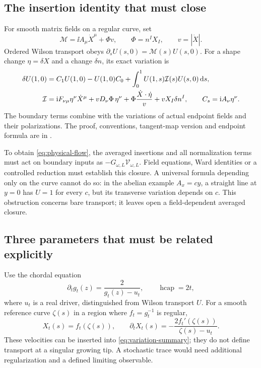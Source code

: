 \subsection{The insertion identity that must close}

For smooth matrix fields on a regular curve, set
\[
 \mathcal M=\ii A_\mu\dot X^\mu+\Phi v,\qquad
 \Phi=n^I X_I,\qquad v=|\dot X|.
\]
Ordered Wilson transport obeys
$\partial_sU(s,0)=\mathcal M(s)U(s,0)$.
For a shape change $\eta=\delta X$ and a change $\delta n$,
its exact variation is
\begin{align}\label{eq:variation-summary}
 \delta U(1,0)
 &=C_1U(1,0)-U(1,0)C_0
   +\int_0^1U(1,s)\mathcal I(s)U(s,0)\,\mathrm d s,\\
 \mathcal I
 &=\mathrm i F_{\nu\mu}\eta^\nu\dot X^\mu
   +vD_\nu\Phi\,\eta^\nu
   +\Phi\frac{\dot X\cdot\dot\eta}{v}
   +vX_I\delta n^I,\qquad C_s=\mathrm i A_\nu\eta^\nu.
 \notag
\end{align}
The boundary terms combine with the variations of actual endpoint
fields and their polarizations. The proof, conventions, tangent-map
version and endpoint formula are in \cite[Section~S4]{Supplement}.

To obtain \eqref{eq:physical-flow}, the averaged insertions and all
normalization terms must act on boundary inputs as
$-G_{\omega,L}\mathcal V_{\omega,L}$. Field equations, Ward
identities or a controlled reduction must establish this closure.
A universal formula depending only on the curve cannot do so:
in the abelian example $A_x=cy$, a straight line at $y=0$ has
$U=1$ for every $c$, but its transverse variation depends on $c$.
This obstruction concerns bare transport; it leaves open a
field-dependent averaged closure.

\subsection{Three parameters that must be related explicitly}

Use the chordal equation
\begin{equation}\label{eq:main-loewner}
 \partial_tg_t(z)=\frac2{g_t(z)-u_t},
 \qquad \operatorname{hcap}=2t,
\end{equation}
where $u_t$ is a real driver, distinguished from Wilson transport
$U$. For a smooth reference curve $\zeta(s)$ in a region where
$f_t=g_t^{-1}$ is regular,
\[
 X_t(s)=f_t(\zeta(s)),\qquad
 \partial_tX_t(s)=-\frac{2f_t'(\zeta(s))}{\zeta(s)-u_t}.
\]
These velocities can be inserted into
\eqref{eq:variation-summary}; they do not define transport at a
singular growing tip. A stochastic trace would need additional
regularization and a defined limiting observable.

